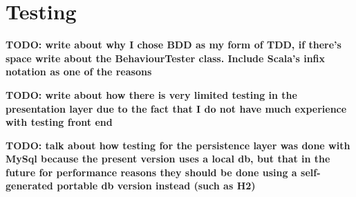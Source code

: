\section{Testing} \label{sec:Testing}

\textbf{TODO: write about why I chose BDD as my form of TDD, if there's space
write about the BehaviourTester class. Include Scala's infix notation as one of
the reasons}

\textbf{TODO: write about how there is very limited testing in the presentation
layer due to the fact that I do not have much experience with testing front
end}


\textbf{TODO: talk about how testing for the persistence layer was done with
MySql because the present version uses a local db, but that in the future for
performance reasons they should be done using a self-generated portable db
version instead (such as H2)}
